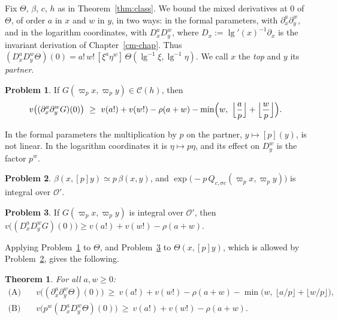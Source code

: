 \documentclass[reqno]{amsart}
\newcounter{chap}
\theoremstyle{definition}
\newtheorem{problem}{Problem}[section]
\theoremstyle{plain}
\newtheorem{theorem}{Theorem}[section]
\newcommand{\Oc}{\mathcal{O}}
\newcommand{\Cc}{\mathcal{C}}
\newcommand{\lgg}{\operatorname{lg}}
\begin{document}
Fix \(\Theta\), \(\beta\), \(c\), \(h\) as in Theorem~\ref{thm:class}.  We bound the mixed derivatives at \(0\) of \(\Theta\), of order \(a\) in \(x\) and \(w\) in \(y\), in two ways: in the formal parameters, with \(\partial_x^a \partial_y^w\), and in the logarithm coordinates, with \(D_x^a D_y^w\), where \(D_x := \lgg'(x)^{-1}\partial_x\) is the invariant derivation of Chapter~\ref{cm-chap}.  Thus \((D_x^a D_y^w \Theta)(0) = a!\, w!\, [\xi^a \eta^w]\, \Theta(\lgg^{-1} \xi, \lgg^{-1} \eta)\).  We call \(x\) the \emph{top} and \(y\) its \emph{partner}.

\begin{problem}\label{pr:estA}
If \(G(\varpi_p x, \varpi_p y) \in \Cc(h)\), then
\[
  v\bigl((\partial_x^a\partial_y^w G)(0)\bigr) \ \ge\ v(a!) + v(w!) - \rho(a+w) - \min\Bigl(w,\ \Bigl\lfloor \frac ap \Bigr\rfloor + \Bigl\lfloor \frac wp \Bigr\rfloor\Bigr).
\]
\end{problem}

In the formal parameters the multiplication by \(p\) on the partner, \(y \mapsto [p](y)\), is not linear.  In the logarithm coordinates it is \(\eta \mapsto p\eta\), and its effect on \(D_y^w\) is the factor \(p^w\).

\begin{problem}\label{pr:hecke}
\(\beta(x, [p]y) \simeq p\,\beta(x,y)\), and \(\exp\bigl(-p\,Q_{c,\sigma c}(\varpi_p x, \varpi_p y)\bigr)\) is integral over \(\Oc'\).
\end{problem}

\begin{problem}\label{pr:logcoord}
If \(G(\varpi_p x, \varpi_p y)\) is integral over \(\Oc'\), then \(v\bigl((D_x^a D_y^w G)(0)\bigr) \ge v(a!) + v(w!) - \rho(a+w)\).
\end{problem}

Applying Problem~\ref{pr:estA} to \(\Theta\), and Problem~\ref{pr:logcoord} to \(\Theta(x, [p]y)\), which is allowed by Problem~\ref{pr:hecke}, gives the following.

\begin{theorem}\label{thm:two}
For all \(a, w \ge 0\):
\begin{align*}
  \text{(A)}\quad & v\bigl((\partial_x^a\partial_y^w \Theta)(0)\bigr) \ \ge\ v(a!) + v(w!) - \rho(a+w) - \min\bigl(w,\ \lfloor a/p \rfloor + \lfloor w/p \rfloor\bigr), \\
  \text{(B)}\quad & v\bigl(p^w (D_x^a D_y^w \Theta)(0)\bigr) \ \ge\ v(a!) + v(w!) - \rho(a+w) .
\end{align*}
\end{theorem}
\end{document}
